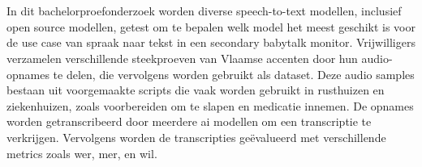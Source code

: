 
%
%
%
%
%

%



\chapter*{}

In dit bachelorproefonderzoek worden diverse speech-to-text modellen, inclusief open source modellen, getest om te bepalen welk model het meest geschikt is voor de use case van spraak naar tekst in een secondary babytalk monitor. Vrijwilligers verzamelen verschillende steekproeven van Vlaamse accenten door hun audio-opnames te delen, die vervolgens worden gebruikt als dataset. Deze audio samples bestaan uit voorgemaakte scripts die vaak worden gebruikt in rusthuizen en ziekenhuizen, zoals voorbereiden om te slapen en medicatie innemen. De opnames worden getranscribeerd door meerdere \gls{ai} modellen om een transcriptie te verkrijgen. Vervolgens worden de transcripties geëvalueerd met verschillende metrics zoals \gls{wer}, \gls{mer}, en \gls{wil}.

